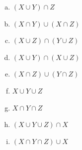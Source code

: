 \documentclass[a4paper,14pt]{article}
\begin{document}
\begin{multicols}{2}
\begin{enumerate}
\begin{enumerate}[a)]
    				\item $(X \cup Y) \cap Z$
    				\item $(X \cap Y) \cup (X \cap Z)$
    				\item $(X \cup Z) \cap (Y \cup Z)$
    				\item $(X \cup Y) \cap (X \cup Z)$
    				\item $(X \cap Z) \cup (Y \cap Z)$
    				\item $X \cup Y \cup Z$
    				\item $X \cap Y \cap Z$
    				\item $(X \cup Y \cup Z) \cap X$
    				\item $(X \cap Y \cap Z) \cup X$
    			\end{enumerate}
    		\end{enumerate}
    		$~$ \\ $~$ \\ $~$ \\ $~$ \\ $~$ \\ $~$ \\ $~$ \\ $~$ \\ $~$ \\ $~$ \\ $~$ \\ $~$ \\ $~$ \\ $~$ \\ $~$ \\ $~$ \\ $~$ \\ $~$ \\ $~$ \\ $~$ \\ $~$ \\ $~$
	\end{multicols}
\end{document}
